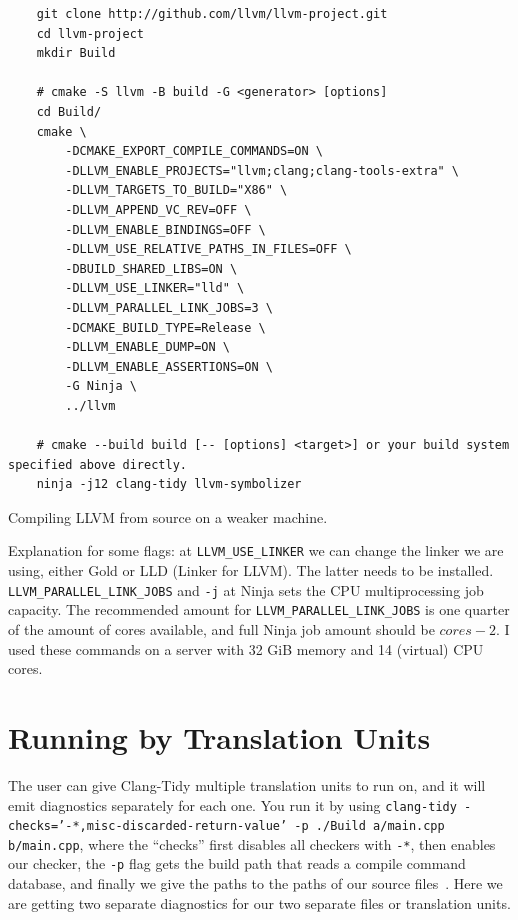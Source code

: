 \begin{listing}
	\begin{verbatim}
	git clone http://github.com/llvm/llvm-project.git
	cd llvm-project
	mkdir Build

	# cmake -S llvm -B build -G <generator> [options]
	cd Build/
	cmake \
		-DCMAKE_EXPORT_COMPILE_COMMANDS=ON \
		-DLLVM_ENABLE_PROJECTS="llvm;clang;clang-tools-extra" \
		-DLLVM_TARGETS_TO_BUILD="X86" \
		-DLLVM_APPEND_VC_REV=OFF \
		-DLLVM_ENABLE_BINDINGS=OFF \
		-DLLVM_USE_RELATIVE_PATHS_IN_FILES=OFF \
		-DBUILD_SHARED_LIBS=ON \
		-DLLVM_USE_LINKER="lld" \
		-DLLVM_PARALLEL_LINK_JOBS=3 \
		-DCMAKE_BUILD_TYPE=Release \
		-DLLVM_ENABLE_DUMP=ON \
		-DLLVM_ENABLE_ASSERTIONS=ON \
		-G Ninja \
		../llvm

	# cmake --build build [-- [options] <target>] or your build system specified above directly.
	ninja -j12 clang-tidy llvm-symbolizer
\end{verbatim}
	\caption{Compiling LLVM from source on a weaker machine.}\label{lst:compile-commands}
\end{listing}

Explanation for some flags: at \texttt{LLVM_USE_LINKER} we can change the linker we are using, either Gold or LLD (Linker for LLVM). The
latter needs to be installed. \texttt{LLVM_PARALLEL_LINK_JOBS} and \texttt{-j} at Ninja sets the CPU multiprocessing job capacity. The recommended amount for
\texttt{LLVM_PARALLEL_LINK_JOBS} is one quarter of the amount of cores available, and full Ninja job amount should be $cores - 2$. I used these commands on a
server with 32 GiB memory and 14 (virtual) CPU cores.


\section{Running by Translation Units}
\label{by-TU}

The user can give Clang-Tidy multiple translation units to run on, and it will emit diagnostics separately for each one. You run it by
using \texttt{clang-tidy -checks='-*,misc-discarded-return-value' -p ./Build a/main.cpp b/main.cpp},
where the ``checks'' first disables all checkers with \texttt{-*}, then enables our checker, the \texttt{-p} flag gets the build path that reads a
compile command database, and finally we give the paths to the paths of our source files~\cite{flags}. Here we are getting two separate diagnostics
for our two separate files or translation units.

